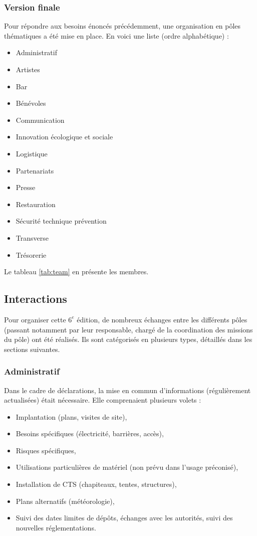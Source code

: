 \documentclass[12pt,a4paper]{report}
\begin{document}
\subsubsection{Version finale}
Pour répondre aux besoins énoncés précédemment, une organisation en pôles thématiques a été mise en place. En voici une liste (ordre alphabétique) : 
\begin{itemize}
\item Administratif
\item Artistes
\item Bar
\item Bénévoles
\item Communication
\item Innovation écologique et sociale
\item Logistique
\item Partenariats
\item Presse
\item Restauration
\item Sécurité technique prévention
\item Transverse
\item Trésorerie
\end{itemize}

Le tableau \ref{tab:team} en présente les membres.

\subsection{Interactions}
Pour organiser cette $6^e$ édition, de nombreux échanges entre les différents pôles (passant notamment par leur responsable, chargé de la coordination des missions du pôle) ont été réalisés. Ils sont catégorisés en plusieurs types, détaillés dans les sections suivantes.

\subsubsection{Administratif}
Dans le cadre de déclarations, la mise en commun d'informations (régulièrement actualisées) était nécessaire. Elle comprenaient plusieurs volets :
\begin{itemize}
\item Implantation (plans, visites de site),
\item Besoins spécifiques (électricité, barrières, accès),
\item Risques spécifiques,
\item Utilisations particulières de matériel (non prévu dans l'usage préconisé),
\item Installation de CTS (chapiteaux, tentes, structures),
\item Plans alternatifs (météorologie),
\item Suivi des dates limites de dépôts, échanges avec les autorités, suivi des nouvelles réglementations.
\end{itemize}
\end{document}
